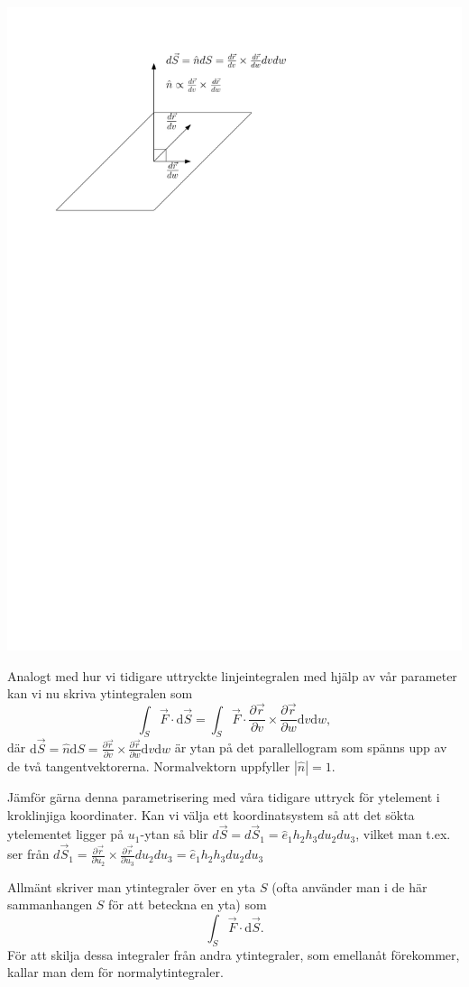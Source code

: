 \documentclass[%
oneside,                 %
final,                   %
10pt]{article}
\begin{document}
\centerline{\includegraphics[width=0.6\linewidth]{fig/ytparametrisering.pdf}}

\vspace{6mm}



Analogt med hur vi tidigare uttryckte linjeintegralen med hjälp av vår parameter kan vi nu skriva ytintegralen som
\begin{equation}
  \int_S \vec{F} \cdot \mbox{d}\vec{S} = \int_S \vec{F} \cdot 
\frac{\partial \vec{r}}{\partial v} \times \frac{\partial \vec{r}}{\partial w}
\mbox{d}v \mbox{d}w,
\end{equation}
där $\mbox{d}\vec{S} = \hat{n} \mbox{d}S = \frac{\partial \vec{r}}{\partial v} \times \frac{\partial \vec{r}}{\partial w} \mbox{d}v \mbox{d}w$ är ytan på det parallellogram som spänns upp av de två tangentvektorerna. Normalvektorn uppfyller $|\hat{n}|=1$.

Jämför gärna denna parametrisering med våra tidigare uttryck för ytelement i kroklinjiga koordinater. Kan vi välja ett koordinatsystem så att det sökta ytelementet ligger på $u_1$-ytan så blir $d\vec{S} = d\vec{S}_1 = \hat{e}_1 h_2 h_3 du_2 du_3$, vilket man t.ex. ser från $d\vec{S}_1 = \frac{\partial \vec{r}}{\partial u_2} \times \frac{\partial \vec{r}}{\partial u_3} du_2 du_3 = \hat{e}_1 h_2 h_3 du_2 du_3$

Allmänt skriver man ytintegraler över en yta $S$ (ofta använder man i de här sammanhangen $S$ för att beteckna en yta) som
\begin{equation}
  \int_S \vec{F} \cdot \mbox{d}\vec{S}.
\end{equation}
För att skilja dessa integraler från andra ytintegraler, som emellanåt förekommer, kallar man dem för normalytintegraler.
\end{document}
